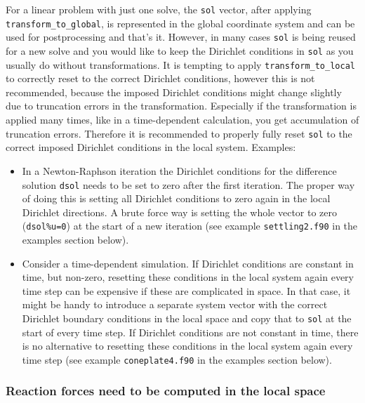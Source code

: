 For a linear problem with just one solve, the \texttt{sol} vector, after applying \texttt{transform\_to\_global}, is represented in the global coordinate system and can be used for postprocessing and that's it. However, in many cases \texttt{sol} is being reused for a new solve and you would like to keep the Dirichlet conditions in \texttt{sol} as you usually do without transformations.  It is tempting to apply \texttt{transform\_to\_local} to correctly reset to the correct Dirichlet conditions, however this is not recommended, because the imposed Dirichlet conditions might change slightly due to truncation errors in the transformation. Especially if the transformation is applied many times, like in a time-dependent calculation, you get accumulation of truncation errors. Therefore it is recommended to properly fully reset \texttt{sol} to the correct imposed Dirichlet conditions in the local system. Examples:
\begin{itemize}
  \item In a Newton-Raphson iteration the Dirichlet conditions for the difference solution \texttt{dsol} needs to be set to zero after the first iteration. The proper way of doing this is setting all Dirichlet conditions to zero again in the local Dirichlet directions. A brute force way is setting the whole vector to zero (\texttt{dsol\%u=0}) at the start of a new iteration (see example \texttt{settling2.f90} in the examples section below).
  \item Consider a time-dependent simulation. If Dirichlet conditions are constant in time, but non-zero, resetting these conditions in the local system again every time step can be expensive if these are complicated in space. In that case, it might be handy to introduce a separate system vector with the correct Dirichlet boundary conditions in the local space and copy that to \texttt{sol} at the start of every time step. If Dirichlet conditions are not constant in time, there is no alternative to resetting these conditions in the local system again every time step (see example \texttt{coneplate4.f90} in the examples section below).  
\end{itemize}

\subsubsection{Reaction forces need to be computed in the local space}

